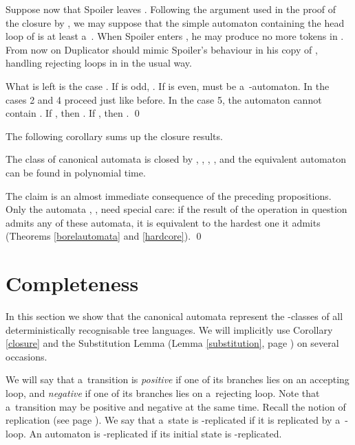 \documentclass{LMCS}
\begin{document}
Suppose now that Spoiler leaves . Following the argument used in the proof of the closure by , we may suppose that the simple automaton containing the head loop of  is at least a~. When Spoiler enters , he may produce no more tokens in .  From now on Duplicator should mimic Spoiler's behaviour in his copy of , handling rejecting loops in  in the usual way.

\vspace{10pt}

What is left is the case . If  is odd, . If  is even,  must be a~-automaton. In the cases 2 and 4 proceed just like before. In the case 5, the automaton  cannot contain . If , then   . If , then  . \qed
 

\vspace{5pt}

 The following corollary sums up the closure results. 

\begin{cor} \label{closure}
The class of canonical automata  is closed by , , , , and the equivalent automaton can be found in polynomial time. 
\end{cor} 

\proof The claim is an almost immediate consequence of the preceding propositions. Only the automata , ,  need special care: if the result of the operation in question admits any of these automata, it is equivalent to the hardest one it admits (Theorems \ref{borelautomata} and \ref{hardcore}). \qed


\section{Completeness} \label{sect:completeness}

In this section we show that the canonical automata represent the -classes of all deterministically recognisable tree languages. We will implicitly use Corollary \ref{closure} and the Substitution Lemma (Lemma \ref{substitution}, page \pageref{substitution}) on several occasions. 

We will say that a~transition is {\em positive}  if one of its branches lies on an accepting loop, and {\em negative}  if one of its branches lies on a~rejecting loop. Note that a~transition may be positive and negative at the same time. Recall the notion of replication (see page \pageref{replicated}). We say that a~state is -replicated if it is replicated by a~-loop. An automaton is -replicated if its initial state is -replicated.
\end{document}
